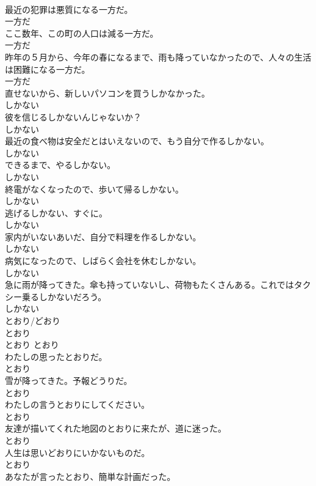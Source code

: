 \documentclass[8pt]{extreport}
\begin{document}
\begin{CJK}{UTF8}{min}
\\	最近の犯罪は悪質になる一方だ。	
\\	一方だ
\\	ここ数年、この町の人口は減る一方だ。	
\\	一方だ
\\	昨年の５月から、今年の春になるまで、雨も降っていなかったので、人々の生活は困難になる一方だ。	
\\	一方だ
\\	直せないから、新しいパソコンを買うしかなかった。	
\\	しかない
\\	彼を信じるしかないんじゃないか？	
\\	しかない
\\	最近の食べ物は安全だとはいえないので、もう自分で作るしかない。	
\\	しかない
\\	できるまで、やるしかない。	
\\	しかない
\\	終電がなくなったので、歩いて帰るしかない。	
\\	しかない
\\	逃げるしかない、すぐに。	
\\	しかない
\\	家内がいないあいだ、自分で料理を作るしかない。	
\\	しかない
\\	病気になったので、しばらく会社を休むしかない。	
\\	しかない
\\	急に雨が降ってきた。傘も持っていないし、荷物もたくさんある。これではタクシー乗るしかないだろう。	
\\	しかない
\\	とおり/どおり	
\\	とおり	
\\	とおり	とおり
\\	わたしの思ったとおりだ。	
\\	とおり
\\	雪が降ってきた。予報どうりだ。	
\\	とおり
\\	わたしの言うとおりにしてください。	
\\	とおり
\\	友達が描いてくれた地図のとおりに来たが、道に迷った。	
\\	とおり
\\	人生は思いどおりにいかないものだ。	
\\	とおり
\\	あなたが言ったとおり、簡単な計画だった。	

\end{CJK}
\end{document}

